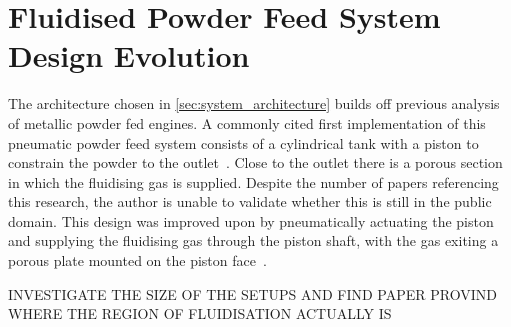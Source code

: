 

\newpage
\section{Fluidised Powder Feed System Design Evolution}\label{sec:fluidised-powder-feed-systems}
The architecture chosen in \autoref{sec:system_architecture} builds off previous analysis of metallic powder fed engines. A commonly cited first implementation of this pneumatic powder feed system consists of a cylindrical tank with a piston to constrain the powder to the outlet~\cite{LI2021712}. Close to the outlet there is a porous section in which the fluidising gas is supplied. Despite the number of papers referencing this research, the author is unable to validate whether this is still in the public domain. This design was improved upon by pneumatically actuating the piston and supplying the fluidising gas through the piston shaft, with the gas exiting a porous plate mounted on the piston face~\cite{Loftus1972}. 

INVESTIGATE THE SIZE OF THE SETUPS AND FIND PAPER PROVIND WHERE THE REGION OF FLUIDISATION ACTUALLY IS



